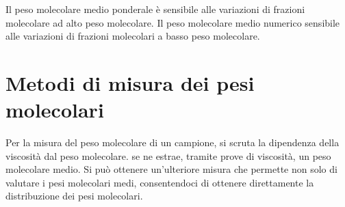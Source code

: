 Il peso molecolare medio ponderale è sensibile alle variazioni di frazioni molecolare ad alto peso molecolare.
Il peso molecolare medio numerico sensibile alle variazioni di frazioni molecolari a basso peso molecolare.

\section{Metodi di misura dei pesi molecolari}
Per la misura del peso molecolare di un campione, si scruta la dipendenza della viscosità dal peso molecolare. 
se ne estrae, tramite prove di viscosità, un peso molecolare medio. 
Si può ottenere un'ulteriore misura che permette non solo di valutare i pesi molecolari medi, consentendoci di ottenere direttamente la distribuzione dei pesi molecolari.


